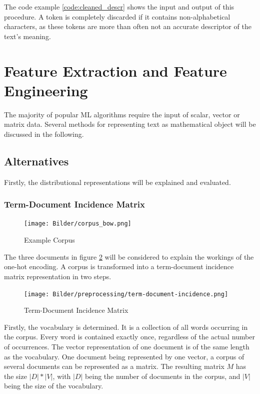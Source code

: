 	 The code example \ref{code:cleaned_descr} shows the input and output of this procedure. A token is completely discarded if it contains non-alphabetical characters, as these tokens are more than often not an accurate descriptor of the text's meaning.	

        
        \section{Feature Extraction and Feature Engineering}
        \label{section:feature-extraction}
        The majority of popular \ac{ML} algorithms require the input of scalar, vector or matrix data. Several methods for representing text as mathematical object will be discussed in the following.
    
            \subsection{Alternatives}
            Firstly, the distributional representations will be explained and evaluated.
            
            \subsubsection{Term-Document Incidence Matrix}
			\label{section:tdim}
            \begin{figure}[h]
            	\centering
            	 \texttt{[image: Bilder/corpus\_bow.png]}
            	\caption{Example Corpus}
            	\label{fig:corpus}
            \end{figure}
            The three documents in figure \ref{fig:corpus} will be considered to explain the workings of the one-hot encoding. A corpus is transformed into a term-document incidence matrix representation in two steps. 
            
            \begin{figure}[h!]
            	\centering
            	\texttt{[image: Bilder/preprocessing/term-document-incidence.png]}
            	\caption{Term-Document Incidence Matrix}
            	\label{fig:corpus}
            \end{figure}
            
            Firstly, the vocabulary is determined. 
            It is a collection of all words occurring in the corpus. Every word is contained exactly once, regardless of the actual number of occurrences. The vector representation of one document is of the same length as the vocabulary. One document being represented by one vector, a corpus of several documents can be represented as a matrix. The resulting matrix $M$ has the size $ |D|*|V| $, with $|D|$ being the number of documents in the corpus, and $|V|$ being the size of the vocabulary.
            
